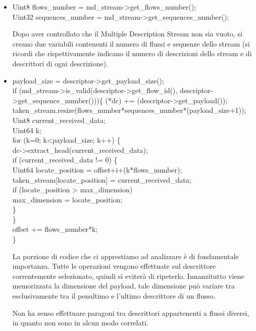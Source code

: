\begin{itemize}
 \item \begin{code}
Uint8 flows\_number = md\_stream->get\_flows\_number();\\
Uint32 sequences\_number = md\_stream->get\_sequences\_number();\\
\end{code}
Dopo aver controllato che il Multiple Description Stream non sia vuoto, si creano due variabili contenenti il numero di flussi e sequenze dello stream (si ricordi che rispettivamente indicano il numero di descrizioni dello stream e di descrittori di ogni descrizione).
 \item \begin{code}
payload\_size = descriptor->get\_payload\_size();\\
if (md\_stream->is\_valid(descriptor->get\_flow\_id(), descriptor->get\_sequence\_number()))\{
(*dc) += (descriptor->get\_payload());\\
taken\_stream.resize(flows\_number*sequences\_number*(payload\_size+1));\\
Uint8 current\_received\_data;\\
Uint64 k;\\
for (k=0; k<payload\_size; k++) \{\\
dc->extract\_head(current\_received\_data);\\
if (current\_received\_data != 0) \{\\
Uint64 locate\_position = offset+i+(k*flows\_number);\\
taken\_stream[locate\_position] = current\_received\_data;\\
if (locate\_position > max\_dimension)\\
max\_dimension = locate\_position;\\
\}\\
\}\\
offset += flows\_number*k;\\
\}\\
\end{code}
La porzione di codice che ci apprestiamo ad analizzare \`e di fondamentale importanza. Tutte le operazioni vengono effettuate sul descrittore correntemente selezionato, quindi si eviterà di ripeterlo. Innanzitutto viene memorizzata la dimensione del payload, tale dimensione pu\`o variare tra esclusivamente tra il penultimo e l'ultimo descrittore di un flusso.
\begin{notabene}
Non ha senso effettuare paragoni tra descrittori appartenenti a flussi diversi, in quanto non sono in alcun modo correlati.

\end{notabene}
\end{itemize}
